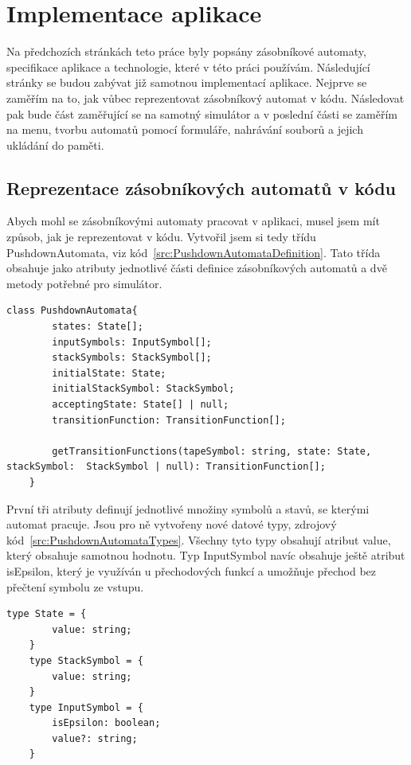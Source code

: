 \chapter{Implementace aplikace}\label{chap:AppImplemetation}

Na předchozích stránkách teto práce byly popsány zásobníkové automaty, specifikace aplikace a technologie, které v této práci používám. Následující stránky se budou zabývat již samotnou implementací aplikace. Nejprve se zaměřím na to, jak vůbec reprezentovat zásobníkový automat v kódu. Následovat pak bude část zaměřující se na samotný simulátor a v poslední části se zaměřím na menu, tvorbu automatů pomocí formuláře, nahrávání souborů a jejich ukládání do paměti.

\section{Reprezentace zásobníkových automatů v kódu}

Abych mohl se zásobníkovými automaty pracovat v aplikaci, musel jsem mít způsob, jak je reprezentovat v kódu. Vytvořil jsem si tedy třídu PushdownAutomata, viz kód~\ref{src:PushdownAutomataDefinition}. Tato třída obsahuje jako atributy jednotlivé části definice zásobníkových automatů a dvě metody potřebné pro simulátor.

\begin{lstlisting}[label=src:PushdownAutomataDefinition, caption={Deklarce třídy PushdownAutomata}]
    class PushdownAutomata{
        states: State[];
        inputSymbols: InputSymbol[];
        stackSymbols: StackSymbol[];
        initialState: State;
        initialStackSymbol: StackSymbol;
        acceptingState: State[] | null;
        transitionFunction: TransitionFunction[];

        getTransitionFunctions(tapeSymbol: string, state: State, stackSymbol:  StackSymbol | null): TransitionFunction[];
    }
\end{lstlisting}

První tři atributy definují jednotlivé množiny symbolů a stavů, se kterými automat pracuje. Jsou pro ně vytvořeny nové datové typy, zdrojový kód~\ref{src:PushdownAutomataTypes}. Všechny tyto typy obsahují atribut value, který obsahuje samotnou hodnotu. Typ InputSymbol navíc obsahuje ještě atribut isEpsilon, který je využíván u přechodových funkcí a umožňuje přechod bez přečtení symbolu ze vstupu.

\begin{lstlisting}[label=src:PushdownAutomataTypes, caption={Datové typ State, StackSymbol, InputSymbol}]
    type State = {
        value: string;
    }
    type StackSymbol = {
        value: string;
    }
    type InputSymbol = {
        isEpsilon: boolean;
        value?: string;
    }
\end{lstlisting}

